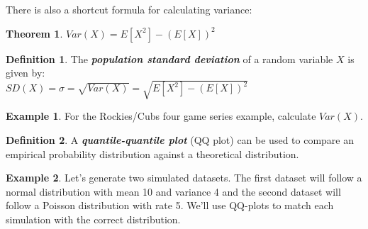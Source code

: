 \documentclass[
  11pt,
]{book}
\newtheorem{theorem}{Theorem}[chapter]
\theoremstyle{definition}
\newtheorem{definition}{Definition}[chapter]
\theoremstyle{definition}
\newtheorem{example}{Example}[chapter]
\theoremstyle{definition}
\theoremstyle{definition}
\theoremstyle{remark}
\begin{document}
There is also a shortcut formula for calculating variance:

\begin{theorem}
\(Var(X) = E[X^2] - (E[X])^2\)
\end{theorem}

\begin{definition}
The \textbf{\emph{population standard deviation}} of a random variable \(X\) is given by:\\

\(SD(X) = \sigma = \sqrt{Var(X)} = \sqrt{E[X^2]-(E[X])^2}\)
\end{definition}

\begin{example}
For the Rockies/Cubs four game series example, calculate \(Var(X)\).
\end{example}

\vfill
\vfill
\vfill
\vfill
\vfill

\newpage

\begin{definition}
A \textbf{\emph{quantile-quantile plot}} (QQ plot) can be used to compare an empirical probability distribution against a theoretical distribution.
\end{definition}

\begin{example}
Let's generate two simulated datasets. The first dataset will follow a normal distribution with mean 10 and variance 4 and the second dataset will follow a Poisson distribution with rate 5. We'll use QQ-plots to match each simulation with the correct distribution.
\end{example}
\end{document}
